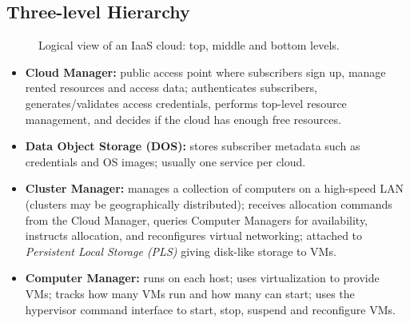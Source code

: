 \documentclass[11pt,a4paper,openany]{report}
\begin{document}
\subsection{Three-level Hierarchy}
\begin{figure}[H]
\centering
{}
\caption{Logical view of an IaaS cloud: top, middle and bottom levels.}
\end{figure}

\begin{itemize}[leftmargin=*]
  \item \textbf{Cloud Manager:} public access point where subscribers sign up, manage rented resources and
        access data; authenticates subscribers, generates/validates access credentials, performs top-level
        resource management, and decides if the cloud has enough free resources.
  \item \textbf{Data Object Storage (DOS):} stores subscriber metadata such as credentials and OS images;
        usually one service per cloud.
  \item \textbf{Cluster Manager:} manages a collection of computers on a high-speed LAN (clusters may be
        geographically distributed); receives allocation commands from the Cloud Manager, queries Computer
        Managers for availability, instructs allocation, and reconfigures virtual networking; attached to
        \emph{Persistent Local Storage (PLS)} giving disk-like storage to VMs.
  \item \textbf{Computer Manager:} runs on each host; uses virtualization to provide VMs; tracks how many VMs
        run and how many can start; uses the hypervisor command interface to start, stop, suspend and
        reconfigure VMs.
\end{itemize}
\end{document}
